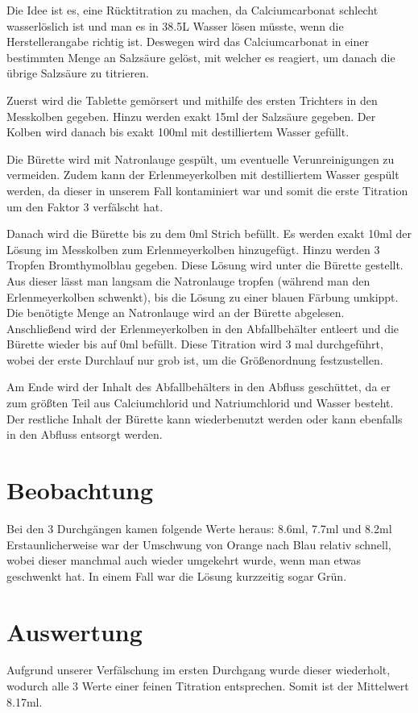 \documentclass[8pt, letterpaper]{article}
\begin{document}
Die Idee ist es, eine Rücktitration zu machen, da Calciumcarbonat schlecht wasserlöslich ist und man es in 38.5L Wasser lösen müsste, wenn die Herstellerangabe richtig ist.
Deswegen wird das Calciumcarbonat in einer bestimmten Menge an Salzsäure gelöst, mit welcher es reagiert, um danach die übrige Salzsäure zu titrieren.

Zuerst wird die Tablette gemörsert und mithilfe des ersten Trichters in den Messkolben gegeben. Hinzu werden exakt 15ml der Salzsäure gegeben. Der Kolben wird danach bis exakt 100ml mit destilliertem Wasser gefüllt.

Die Bürette wird mit Natronlauge gespült, um eventuelle Verunreinigungen zu vermeiden. Zudem kann der Erlenmeyerkolben mit destilliertem Wasser gespült werden, da dieser in unserem Fall kontaminiert war und somit die erste Titration um den Faktor 3 verfälscht hat.

Danach wird die Bürette bis zu dem 0ml Strich befüllt. Es werden exakt 10ml der Lösung im Messkolben zum Erlenmeyerkolben hinzugefügt. Hinzu werden 3 Tropfen Bromthymolblau gegeben.
Diese Lösung wird unter die Bürette gestellt. Aus dieser lässt man langsam die Natronlauge tropfen (während man den Erlenmeyerkolben schwenkt), bis die Lösung zu einer blauen Färbung umkippt.
Die benötigte Menge an Natronlauge wird an der Bürette abgelesen. Anschließend wird der Erlenmeyerkolben in den Abfallbehälter entleert und die Bürette wieder bis auf 0ml befüllt.
Diese Titration wird 3 mal durchgeführt, wobei der erste Durchlauf nur grob ist, um die Größenordnung festzustellen.

Am Ende wird der Inhalt des Abfallbehälters in den Abfluss geschüttet, da er zum größten Teil aus Calciumchlorid und Natriumchlorid und Wasser besteht.
Der restliche Inhalt der Bürette kann wiederbenutzt werden oder kann ebenfalls in den Abfluss entsorgt werden.

\section{Beobachtung}
Bei den 3 Durchgängen kamen folgende Werte heraus: 8.6ml, 7.7ml und 8.2ml \\
Erstaunlicherweise war der Umschwung von Orange nach Blau relativ schnell, wobei dieser manchmal auch wieder umgekehrt wurde, wenn man etwas geschwenkt hat. In einem Fall war die Lösung kurzzeitig sogar Grün.

\section{Auswertung}
Aufgrund unserer Verfälschung im ersten Durchgang wurde dieser wiederholt, wodurch alle 3 Werte einer feinen Titration entsprechen.
Somit ist der Mittelwert 8.17ml.
\end{document}

